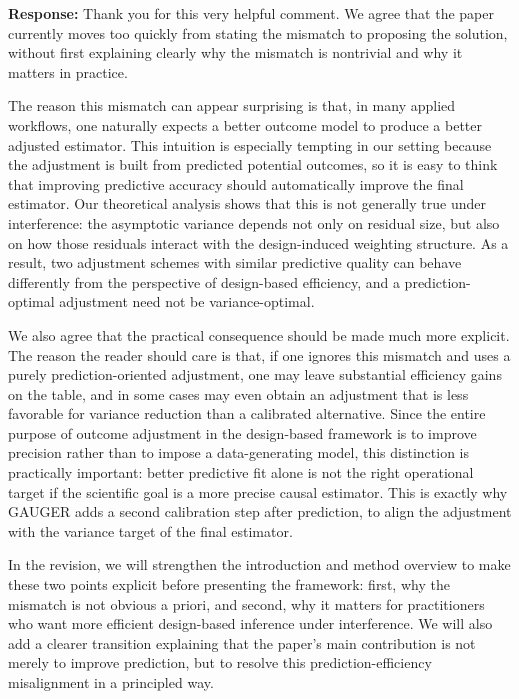 \documentclass{article}
\theoremstyle{plain}
\theoremstyle{definition}
\theoremstyle{remark}
\begin{document}
\noindent\textbf{Response:} Thank you for this very helpful comment. We agree that the paper currently moves too quickly from stating the mismatch to proposing the solution, without first explaining clearly why the mismatch is nontrivial and why it matters in practice.

The reason this mismatch can appear surprising is that, in many applied workflows, one naturally expects a better outcome model to produce a better adjusted estimator. This intuition is especially tempting in our setting because the adjustment is built from predicted potential outcomes, so it is easy to think that improving predictive accuracy should automatically improve the final estimator. Our theoretical analysis shows that this is not generally true under interference: the asymptotic variance depends not only on residual size, but also on how those residuals interact with the design-induced weighting structure. As a result, two adjustment schemes with similar predictive quality can behave differently from the perspective of design-based efficiency, and a prediction-optimal adjustment need not be variance-optimal.

We also agree that the practical consequence should be made much more explicit. The reason the reader should care is that, if one ignores this mismatch and uses a purely prediction-oriented adjustment, one may leave substantial efficiency gains on the table, and in some cases may even obtain an adjustment that is less favorable for variance reduction than a calibrated alternative. Since the entire purpose of outcome adjustment in the design-based framework is to improve precision rather than to impose a data-generating model, this distinction is practically important: better predictive fit alone is not the right operational target if the scientific goal is a more precise causal estimator. This is exactly why GAUGER adds a second calibration step after prediction, to align the adjustment with the variance target of the final estimator.

In the revision, we will strengthen the introduction and method overview to make these two points explicit before presenting the framework: first, why the mismatch is not obvious a priori, and second, why it matters for practitioners who want more efficient design-based inference under interference. We will also add a clearer transition explaining that the paper’s main contribution is not merely to improve prediction, but to resolve this prediction-efficiency misalignment in a principled way.
\end{document}
